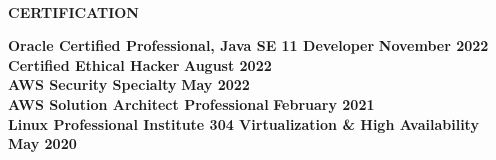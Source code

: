 \begin{center}
    \hrulefill \\
    \begin{large}
        \textbf{CERTIFICATION} \\
    \end{large} 
\end{center}
\textbf{Oracle Certified Professional, Java SE 11 Developer} \hfill \textbf{November 2022} \\
\textbf{Certified Ethical Hacker} \hfill \textbf{August 2022} \\
\textbf{AWS Security Specialty} \hfill \textbf{May 2022} \\
\textbf{AWS Solution Architect Professional} \hfill \textbf{February 2021} \\
\textbf{Linux Professional Institute 304 Virtualization \& High Availability} \hfill \textbf{May 2020}
